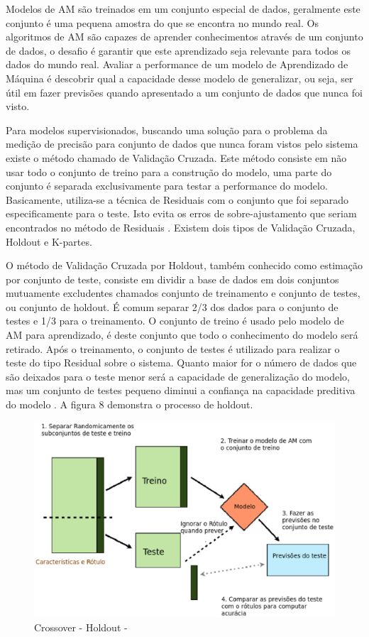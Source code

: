 Modelos de AM são treinados em um conjunto especial de dados, geralmente este conjunto é uma pequena amostra do que se encontra no mundo real. Os algoritmos de AM são capazes de aprender conhecimentos através de um conjunto de dados, o desafio é garantir que este aprendizado seja relevante para todos os dados do mundo real. Avaliar a performance de um modelo de Aprendizado de Máquina é descobrir qual a capacidade desse modelo de generalizar, ou seja, ser útil em fazer previsões quando apresentado a um conjunto de dados que nunca foi visto.

Para modelos supervisionados, buscando uma solução para o problema da medição de precisão para conjunto de dados que nunca foram vistos pelo sistema existe o método chamado de Validação Cruzada. Este método consiste em não usar todo o conjunto de treino para a construção do modelo, uma parte do conjunto é separada exclusivamente para testar a performance do modelo. Basicamente, utiliza-se a técnica de Residuais com o conjunto que foi separado especificamente para o teste. Isto evita os erros de sobre-ajustamento que seriam encontrados no método de Residuais \cite{jeff1997b}. Existem dois tipos de Validação Cruzada, Holdout e K-partes. 

O método de Validação Cruzada por Holdout, também conhecido como estimação por conjunto de teste, consiste em dividir a base de dados em dois conjuntos mutuamente excludentes chamados conjunto de treinamento e conjunto de testes, ou conjunto de holdout. É comum separar 2/3 dos dados para o conjunto de testes e 1/3 para o treinamento. O conjunto de treino é usado pelo modelo de AM para aprendizado, é deste conjunto que todo o conhecimento do modelo será retirado. Após o treinamento, o conjunto de testes é utilizado para realizar o teste do tipo Residual sobre o sistema. Quanto maior for o número de dados que são deixados para o teste menor será a capacidade de generalização do modelo, mas um conjunto de testes pequeno diminui a confiança na capacidade preditiva do modelo \cite{astudy1995}. A figura 8 demonstra o processo de holdout.

\begin{figure}[!h]
\centering
\includegraphics[keepaspectratio=true,scale=0.70]
{figuras/holdout.eps}
\caption{Crossover - Holdout - \cite{real2013}}
\label{over}
\end{figure}

